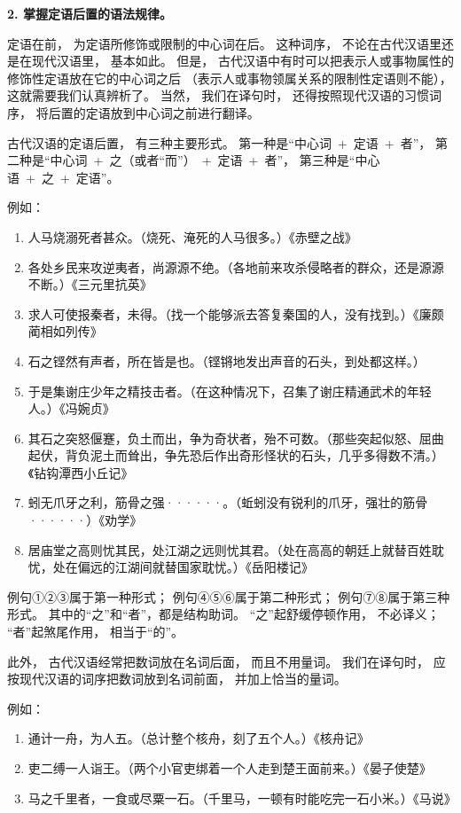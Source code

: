 \textbf{2. 掌握定语后置的语法规律。}

定语在前，
为定语所修饰或限制的中心词在后。
这种词序，
不论在古代汉语里还是在现代汉语里，
基本如此。
但是，
古代汉语中有时可以把表示人或事物属性的修饰性定语放在它的中心词之后
（表示人或事物领属关系的限制性定语则不能），
这就需要我们认真辨析了。
当然，
我们在译句时，
还得按照现代汉语的习惯词序，
将后置的定语放到中心词之前进行翻译。

古代汉语的定语后置，
有三种主要形式。
第一种是“中心词\ +\ 定语\ +\ 者”，
第二种是“中心词\ +\ 之（或者“而”）\ +\ 定语\ +\ 者”，
第三种是“中心语\ +\ 之\ +\ 定语”。

例如：

\noindent
\begin{enumerate}[label=\textcircled{\arabic*}]
	\item 人马烧溺死者甚众。（烧死、淹死的人马很多。）《赤壁之战》
	\item 各处乡民来攻逆夷者，尚源源不绝。（各地前来攻杀侵略者的群众，还是源源不断。）《三元里抗英》
	\item 求人可使报秦者，未得。（找一个能够派去答复秦国的人，没有找到。）《廉颇蔺相如列传》
	\item 石之铿然有声者，所在皆是也。（铿锵地发出声音的石头，到处都这样。）
	\item 于是集谢庄少年之精技击者。（在这种情况下，召集了谢庄精通武术的年轻人。）《冯婉贞》
	\item 其石之突怒偃蹇，负土而出，争为奇状者，殆不可数。（那些突起似怒、屈曲起伏，背负泥土而耸出，争先恐后作出奇形怪状的石头，几乎多得数不清。）《钻钩潭西小丘记》
	\item 蚓无爪牙之利，筋骨之强······。（蚯蚓没有锐利的爪牙，强壮的筋骨······）《劝学》
	\item 居庙堂之高则忧其民，处江湖之远则忧其君。（处在高高的朝廷上就替百姓耽忧，处在偏远的江湖间就替国家耽忧。）《岳阳楼记》
\end{enumerate}

例句①②③属于第一种形式；
例句④⑤⑥属于第二种形式；
例句⑦⑧属于第三种形式。
其中的“之”和“者”，都是结构助词。
“之”起舒缓停顿作用，
不必译义；
“者”起煞尾作用，
相当于“的”。

此外，
古代汉语经常把数词放在名词后面，
而且不用量词。
我们在译句时，
应按现代汉语的词序把数词放到名词前面，
并加上恰当的量词。

例如：

\noindent
\begin{enumerate}[label=\textcircled{\arabic*}]
	\item 通计一舟，为人五。（总计整个核舟，刻了五个人。）《核舟记》
	\item 吏二缚一人诣王。（两个小官吏绑着一个人走到楚王面前来。）《晏子使楚》
	\item 马之千里者，一食或尽粟一石。（千里马，一顿有时能吃完一石小米。）《马说》
\end{enumerate}

